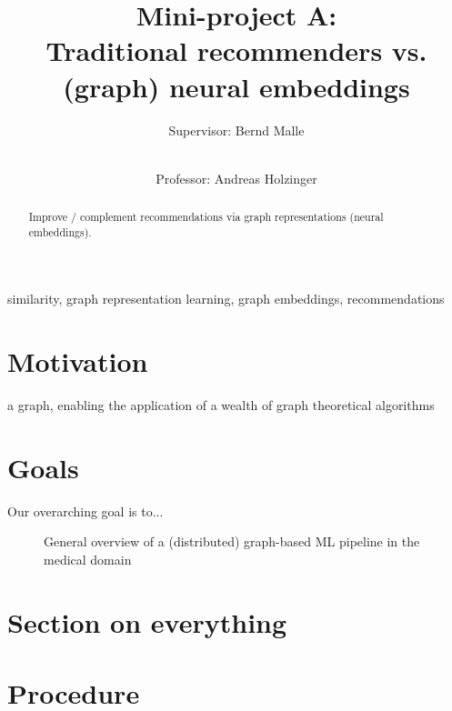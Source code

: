 \documentclass[review]{elsarticle}
\begin{document}
\begin{frontmatter}

\title{Mini-project A: \\ Traditional recommenders vs. (graph) neural embeddings }

\author[TUG,MUG]{Supervisor: Bernd Malle}
\author[TUG,MUG]{\small \\Professor: Andreas Holzinger}

\address[TUG]{Graz University of Technology, Austria}
\address[MUG]{Medical University Graz, Austria}


\begin{abstract}

Improve / complement recommendations via graph representations (neural embeddings).

\end{abstract}

\begin{keyword}
similarity, graph representation learning, graph embeddings, recommendations
\end{keyword}

\end{frontmatter}


\section{Motivation}
\label{sect:motivation}

a graph, enabling the application of a wealth of graph theoretical algorithms 

\section{Goals}
\label{sect:goals}

Our overarching goal is to...

\begin{figure}[hbt!]
\begin{center}
\end{center}
\caption{General overview of a (distributed) graph-based ML pipeline in the medical domain}
\label{fig:Figure-1}
\end{figure}

\section{Section on everything}
\label{section_everything}


\section{Procedure}
\label{sect:procedure}




\end{document}
